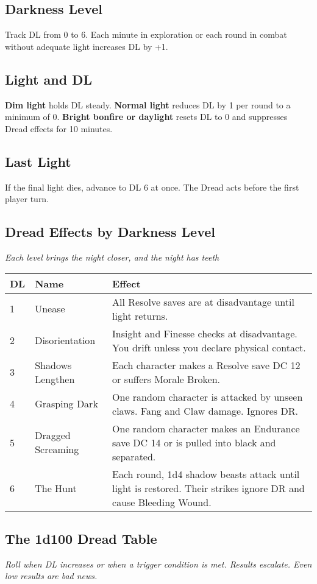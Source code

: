 \documentclass[10pt,twoside]{article}
\begin{document}
\subsection{Darkness Level}
Track DL from 0 to 6. Each minute in exploration or each round in combat without adequate light increases DL by +1.

\subsection{Light and DL}
\textbf{Dim light} holds DL steady. \textbf{Normal light} reduces DL by 1 per round to a minimum of 0. \textbf{Bright bonfire or daylight} resets DL to 0 and suppresses Dread effects for 10 minutes.

\subsection{Last Light}
If the final light dies, advance to DL 6 at once. The Dread acts before the first player turn.

\subsection{Dread Effects by Darkness Level}
\textit{Each level brings the night closer, and the night has teeth}

\begin{tabular}{@{}p{1cm}p{3cm}p{9cm}@{}}
\textbf{DL} & \textbf{Name} & \textbf{Effect} \\
\midrule
1 & Unease & All Resolve saves are at disadvantage until light returns. \\
2 & Disorientation & Insight and Finesse checks at disadvantage. You drift unless you declare physical contact. \\
3 & Shadows Lengthen & Each character makes a Resolve save DC 12 or suffers Morale Broken. \\
4 & Grasping Dark & One random character is attacked by unseen claws. Fang and Claw damage. Ignores DR. \\
5 & Dragged Screaming & One random character makes an Endurance save DC 14 or is pulled into black and separated. \\
6 & The Hunt & Each round, 1d4 shadow beasts attack until light is restored. Their strikes ignore DR and cause Bleeding Wound. \\
\end{tabular}

\subsection{The 1d100 Dread Table}
\textit{Roll when DL increases or when a trigger condition is met. Results escalate. Even low results are bad news.}
\end{document}
